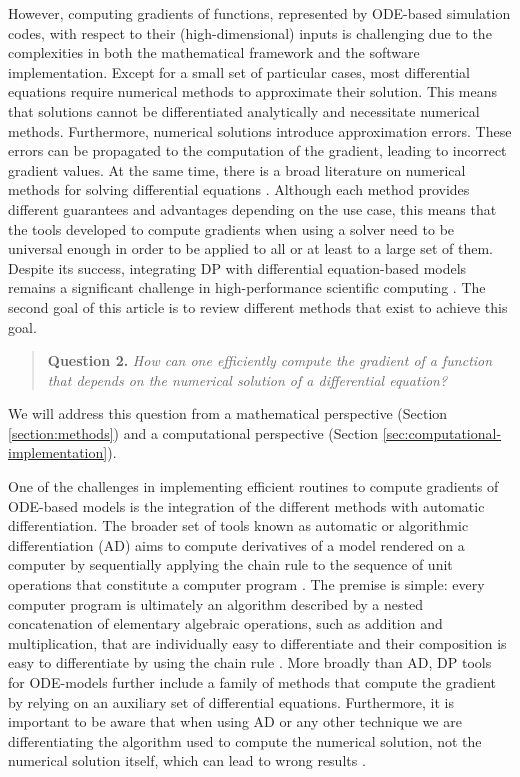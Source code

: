 However, computing gradients of functions, represented by ODE-based simulation codes, with respect to their (high-dimensional) inputs is challenging due to the complexities in both the mathematical framework and the software implementation.
Except for a small set of particular cases, most differential equations require numerical methods to approximate their solution.
This means that solutions cannot be differentiated analytically and necessitate numerical methods. 
Furthermore, numerical solutions introduce approximation errors. 
These errors can be propagated to the computation of the gradient, leading to incorrect gradient values. 
At the same time, there is a broad literature on numerical methods for solving differential equations \cite{hairer-solving-1, hairer-solving-2}. 
Although each method provides different guarantees and advantages depending on the use case, this means that the tools developed to compute gradients when using a solver need to be universal enough in order to be applied to all or at least to a large set of them. 
Despite its success, integrating DP with differential equation-based models remains a significant challenge in high-performance scientific computing \cite{Naumann.2011}.
The second goal of this article is to review different methods that exist to achieve this goal.
\begin{quote}
    \textbf{Question 2. }
    \textit{How can one efficiently compute the gradient of a function that depends on the numerical solution of a differential equation?}
\end{quote}
We will address this question from a mathematical perspective (Section \ref{section:methods}) and a computational perspective (Section \ref{sec:computational-implementation}). 

One of the challenges in implementing efficient routines to compute gradients of ODE-based models is the integration of the different methods with automatic differentiation.
The broader set of tools known as automatic or algorithmic differentiation (AD) aims to compute derivatives of a model rendered on a computer by sequentially applying the chain rule to the sequence of unit operations that constitute a computer program \cite{Griewank:2008kh, Naumann.2011}. 
The premise is simple: every computer program is ultimately an algorithm described by a nested concatenation of elementary algebraic operations, such as addition and multiplication, that are individually easy to differentiate and their composition is easy to differentiate by using the chain rule \cite{Giering:1998in}. 
More broadly than AD, DP tools for ODE-models further include a family of methods that compute the gradient by relying on an auxiliary set of differential equations. 
Furthermore, it is important to be aware that when using AD or any other technique we are differentiating the algorithm used to compute the numerical solution, not the numerical solution itself, which can lead to wrong results \cite{Eberhard_Bischof_1996}.

